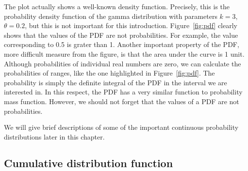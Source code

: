 The plot actually shows a well-known density function.
Precisely, this is the probability density function of
the gamma distribution with parameters $k=3$, $\theta=0.2$,
but this is not important for this introduction.
Figure~\ref{fig:pdf} clearly shows that
the values of the PDF are not probabilities.
For example, the value corresponding to \num{0.5} is grater than \num{1}.
Another important property of the PDF,
more difficult measure from the figure,
is that the area under the curve is \num{1} unit.
Although probabilities of individual real numbers are zero,
we can calculate the probabilities of ranges,
like the one highlighted in Figure~\ref{fig:pdf}.
The probability is simply the definite integral of the PDF
in the interval we are interested in.
In this respect,
the PDF has a very similar function to probability mass function.
However,
we should not forget that the values of a PDF are not probabilities.%

We will give brief descriptions
of some of the important continuous probability distributions
later in this chapter.

\subsection{Cumulative distribution function}

